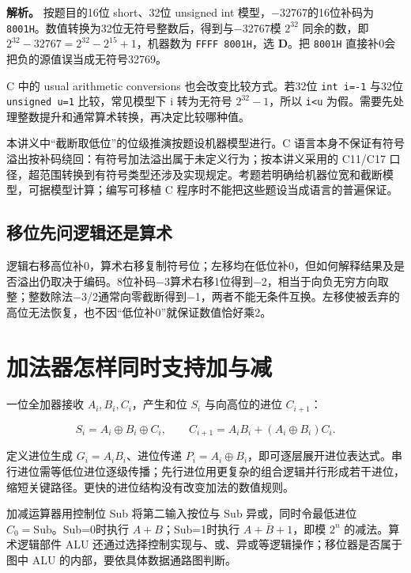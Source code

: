 
\textbf{解析。} 按题目的16位 short、32位 unsigned int 模型，−32767的16位补码为 \allowbreak{}\texttt{8001H}。数值转换为32位无符号整数后，得到与−32767模 \(2^{32}\) 同余的数，即 \(2^{32}-32767=2^{32}-2^{15}+1\)，机器数为 \allowbreak{}\texttt{FFFF\ 8001H}，选 \textbf{D}。把 \allowbreak{}\texttt{8001H} 直接补0会把负的源值误当成无符号32769。

C 中的 usual arithmetic conversions 也会改变比较方式。若32位 \allowbreak{}\texttt{int\ i=-1} 与32位 \allowbreak{}\texttt{unsigned\ u=1} 比较，常见模型下 i 转为无符号 \(2^{32}-1\)，所以 \allowbreak{}\texttt{i\textless{}u} 为假。需要先处理整数提升和通常算术转换，再决定比较哪种值。

本讲义中``截断取低位''的位级推演按题设机器模型进行。C 语言本身不保证有符号溢出按补码绕回：有符号加法溢出属于未定义行为；按本讲义采用的 C11/C17 口径，超范围转换到有符号类型还涉及实现规定。考题若明确给机器位宽和截断模型，可据模型计算；编写可移植 C 程序时不能把这些题设当成语言的普遍保证。

\subsection{移位先问逻辑还是算术}\label{co-c02-h78}

逻辑右移高位补0，算术右移复制符号位；左移均在低位补0，但如何解释结果及是否溢出仍取决于编码。8位补码−3算术右移1位得到−2，相当于向负无穷方向取整；整数除法−3/2通常向零截断得到−1，两者不能无条件互换。左移使被丢弃的高位无法恢复，也不因``低位补0''就保证数值恰好乘2。

\section{加法器怎样同时支持加与减}\label{co-02-04}

一位全加器接收 \(A_i,B_i,C_i\)，产生和位 \(S_i\) 与向高位的进位 \(C_{i+1}\)：

\[
S_i=A_i\oplus B_i\oplus C_i,
\qquad C_{i+1}=A_iB_i+(A_i\oplus B_i)C_i.
\]

定义进位生成 \(G_i=A_iB_i\)、进位传递 \(P_i=A_i\oplus B_i\)，即可逐层展开进位表达式。串行进位需等低位进位逐级传播；先行进位用更复杂的组合逻辑并行形成若干进位，缩短关键路径。更快的进位结构没有改变加法的数值规则。

加减运算器用控制位 Sub 将第二输入按位与 Sub 异或，同时令最低进位 \(C_0=\mathrm{Sub}\)。Sub=0时执行 \(A+B\)；Sub=1时执行 \(A+\overline B+1\)，即模 \(2^n\) 的减法。算术逻辑部件 ALU 还通过选择控制实现与、或、异或等逻辑操作；移位器是否属于图中 ALU 的内部，要依具体数据通路图判断。

